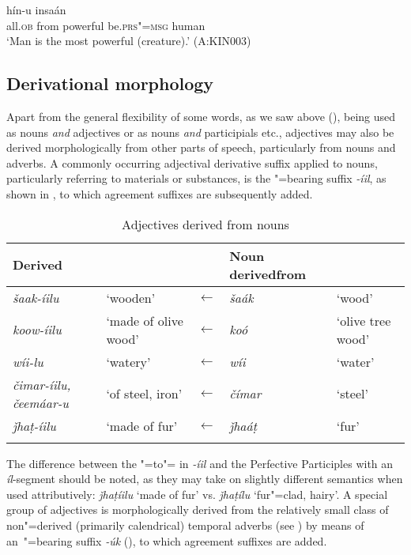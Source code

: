 {\begin{exe}
\ex
\label{ex:6-9}
 hín-u insaán \\
all.\textsc{ob} from powerful be.\textsc{prs"=msg} human \\
\glt `Man is the most powerful (creature).' (A:KIN003)
\end{exe}

\subsection{Derivational morphology}
\label{subsec:6-3-4}

Apart from the general flexibility of some words, as we saw above (), being used as nouns \textit{and} adjectives or as nouns \textit{and} participials etc., adjectives may also be derived morphologically from other parts of speech, particularly from nouns and adverbs. A commonly occurring adjectival derivative suffix applied to nouns, particularly referring to materials or substances, is the "=bearing  suffix \textit{-íil}, as shown in , to which agreement suffixes are subsequently added.


\begin{table}[ht]
\caption{Adjectives derived from nouns}
\begin{tabularx}{\textwidth}{ Q l l P{22mm} l }
\lsptoprule
Derived  &
&
&
Noun derived\newline from &
\\\hline
\textit{šaak-íilu} &
`wooden' &
$\leftarrow$ &
\textit{šaák} &
`wood'\\
\textit{koow-íilu} &
`made of olive wood' &
$\leftarrow$ &
\textit{koó} &
`olive tree wood'\\
\textit{wíi-lu} &
`watery' &
$\leftarrow$ &
\textit{wíi} &
`water'\\
\textit{čimar-íilu, čeemáar-u} &
`of steel, iron' &
$\leftarrow$ &
\textit{čímar} &
`steel'\\
\textit{ǰhaṭ-íilu} &
`made of fur' &
$\leftarrow$ &
\textit{ǰhaáṭ} &
`fur'\\\lspbottomrule
\end{tabularx}
\label{tab:6-5}
\end{table}


The difference between the "=to"=  in \textit{-íil} and the Perfective Participles with an \textit{íl}-segment should be noted, as they may take on slightly different semantics when used attributively: \textit{ǰhaṭíilu} `made of fur' vs. \textit{ǰhaṭílu} `fur"=clad, hairy'. A special group of adjectives is morphologically derived from the relatively small class of non"=derived (primarily calendrical) temporal adverbs (see ) by means of an~"=bearing suffix \textit{-úk} (), to which agreement suffixes are added.


}
